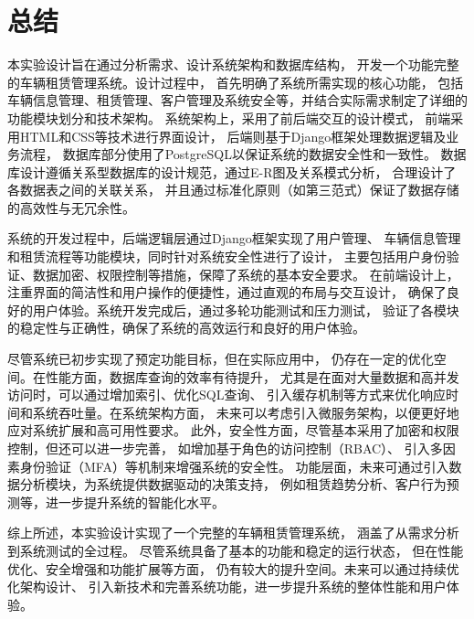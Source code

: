 \documentclass[UTF8,a4paper,12pt]{ctexart}
\begin{document}
\section{总结}

本实验设计旨在通过分析需求、设计系统架构和数据库结构，
开发一个功能完整的车辆租赁管理系统。设计过程中，
首先明确了系统所需实现的核心功能，
包括车辆信息管理、租赁管理、客户管理及系统安全等，并结合实际需求制定了详细的功能模块划分和技术架构。
系统架构上，采用了前后端交互的设计模式，
前端采用HTML和CSS等技术进行界面设计，
后端则基于Django框架处理数据逻辑及业务流程，
数据库部分使用了PostgreSQL以保证系统的数据安全性和一致性。
数据库设计遵循关系型数据库的设计规范，通过E-R图及关系模式分析，
合理设计了各数据表之间的关联关系，
并且通过标准化原则（如第三范式）保证了数据存储的高效性与无冗余性。

系统的开发过程中，后端逻辑层通过Django框架实现了用户管理、
车辆信息管理和租赁流程等功能模块，同时针对系统安全性进行了设计，
主要包括用户身份验证、数据加密、权限控制等措施，保障了系统的基本安全要求。
在前端设计上，注重界面的简洁性和用户操作的便捷性，通过直观的布局与交互设计，
确保了良好的用户体验。系统开发完成后，通过多轮功能测试和压力测试，
验证了各模块的稳定性与正确性，确保了系统的高效运行和良好的用户体验。

尽管系统已初步实现了预定功能目标，但在实际应用中，
仍存在一定的优化空间。在性能方面，数据库查询的效率有待提升，
尤其是在面对大量数据和高并发访问时，可以通过增加索引、优化SQL查询、
引入缓存机制等方式来优化响应时间和系统吞吐量。在系统架构方面，
未来可以考虑引入微服务架构，以便更好地应对系统扩展和高可用性要求。
此外，安全性方面，尽管基本采用了加密和权限控制，但还可以进一步完善，
如增加基于角色的访问控制（RBAC）、
引入多因素身份验证（MFA）等机制来增强系统的安全性。
功能层面，未来可通过引入数据分析模块，为系统提供数据驱动的决策支持，
例如租赁趋势分析、客户行为预测等，进一步提升系统的智能化水平。

综上所述，本实验设计实现了一个完整的车辆租赁管理系统，
涵盖了从需求分析到系统测试的全过程。
尽管系统具备了基本的功能和稳定的运行状态，
但在性能优化、安全增强和功能扩展等方面，
仍有较大的提升空间。未来可以通过持续优化架构设计、
引入新技术和完善系统功能，进一步提升系统的整体性能和用户体验。




\end{document}
